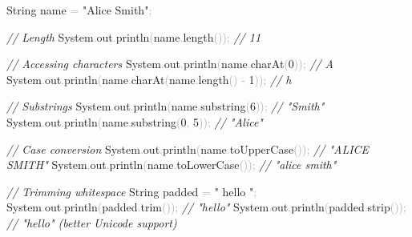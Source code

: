 \documentclass[
  justified,
  openright,
]{tufte-book}
\newcommand{\StringTok}[1]{\textcolor{CodeString}{#1}}              %
\newcommand{\CommentTok}[1]{\textcolor{CodeComment}{\textit{#1}}}  %
\newcommand{\CodeNumTok}[1]{\textcolor{CodeNumber}{#1}}             %
\newcommand{\CodeFuncTok}[1]{\textcolor{CodeKeyword}{#1}}           %
\newcommand{\OperatorTok}[1]{\textcolor{DarkGray}{#1}}              %
\newenvironment{Shaded}{%
  \begin{mdframed}[style=TufteCode]%
}{%
  \end{mdframed}%
}
\begin{document}
\begin{Shaded}
\begin{Highlighting}[]
String name \OperatorTok{=} \StringTok{"Alice Smith"}\OperatorTok{;}
 
\CommentTok{// Length}
System\OperatorTok{.}\CodeFuncTok{out}\OperatorTok{.}\CodeFuncTok{println}\OperatorTok{(}name\OperatorTok{.}\CodeFuncTok{length}\OperatorTok{());}           \CommentTok{// 11}
 
\CommentTok{// Accessing characters}
System\OperatorTok{.}\CodeFuncTok{out}\OperatorTok{.}\CodeFuncTok{println}\OperatorTok{(}name\OperatorTok{.}\CodeFuncTok{charAt}\OperatorTok{(}\CodeNumTok{0}\OperatorTok{));}          \CommentTok{// \textquotesingle{}A\textquotesingle{}}
System\OperatorTok{.}\CodeFuncTok{out}\OperatorTok{.}\CodeFuncTok{println}\OperatorTok{(}name\OperatorTok{.}\CodeFuncTok{charAt}\OperatorTok{(}name\OperatorTok{.}\CodeFuncTok{length}\OperatorTok{()} \OperatorTok{{-}} \CodeNumTok{1}\OperatorTok{));}  \CommentTok{// \textquotesingle{}h\textquotesingle{}}
 
\CommentTok{// Substrings}
System\OperatorTok{.}\CodeFuncTok{out}\OperatorTok{.}\CodeFuncTok{println}\OperatorTok{(}name\OperatorTok{.}\CodeFuncTok{substring}\OperatorTok{(}\CodeNumTok{6}\OperatorTok{));}       \CommentTok{// "Smith"}
System\OperatorTok{.}\CodeFuncTok{out}\OperatorTok{.}\CodeFuncTok{println}\OperatorTok{(}name\OperatorTok{.}\CodeFuncTok{substring}\OperatorTok{(}\CodeNumTok{0}\OperatorTok{,} \CodeNumTok{5}\OperatorTok{));}    \CommentTok{// "Alice"}
 
\CommentTok{// Case conversion}
System\OperatorTok{.}\CodeFuncTok{out}\OperatorTok{.}\CodeFuncTok{println}\OperatorTok{(}name\OperatorTok{.}\CodeFuncTok{toUpperCase}\OperatorTok{());}      \CommentTok{// "ALICE SMITH"}
System\OperatorTok{.}\CodeFuncTok{out}\OperatorTok{.}\CodeFuncTok{println}\OperatorTok{(}name\OperatorTok{.}\CodeFuncTok{toLowerCase}\OperatorTok{());}      \CommentTok{// "alice smith"}
 
\CommentTok{// Trimming whitespace}
String padded \OperatorTok{=} \StringTok{"  hello  "}\OperatorTok{;}
System\OperatorTok{.}\CodeFuncTok{out}\OperatorTok{.}\CodeFuncTok{println}\OperatorTok{(}padded\OperatorTok{.}\CodeFuncTok{trim}\OperatorTok{());}           \CommentTok{// "hello"}
System\OperatorTok{.}\CodeFuncTok{out}\OperatorTok{.}\CodeFuncTok{println}\OperatorTok{(}padded\OperatorTok{.}\CodeFuncTok{strip}\OperatorTok{());}          \CommentTok{// "hello" (better Unicode support)}
 

\end{Highlighting}
\end{Shaded}
\end{document}
